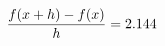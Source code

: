 \documentclass[preview]{standalone}
\begin{document}
\begin{align*}
\special{dvisvgm:raw <g id='unique000'>}\frac{f(x+h)-f(x)}{h} = 2.144\special{dvisvgm:raw </g>}
\end{align*}
\end{document}
